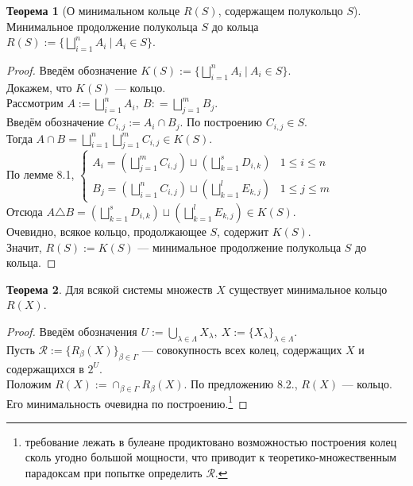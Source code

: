 \documentclass[11pt,a4paper]{report}
\theoremstyle{definition}
\theoremstyle{definition}
\newtheorem{theorem}{Теорема}[section]
\theoremstyle{definition}
\begin{document}
	\begin{theorem}[О минимальном кольце $ R(S) $, содержащем полукольцо $ S $]$  $\\
		Минимальное продолжение полукольца $ S $ до кольца $ R(S) := \{\bigsqcup_{i=1}^{n} A_{i}\ |\ A_{i} \in S \} $.
	\end{theorem}
	\begin{proof}
		Введём обозначение $ K(S) := \{\bigsqcup_{i=1}^{n} A_{i}\ |\ A_{i} \in S \} $.\\ 
		Докажем, что $ K(S) $ — кольцо.\\
		Рассмотрим $ A := \bigsqcup_{i=1}^{n}{A_{i}},\ B : = \bigsqcup_{j=1}^{m}{B_{j}} $.\\
		Введём обозначение $ C_{i,j} := A_{i} \cap B_{j} $. По построению $ C_{i,j} \in S $.\\
		Тогда $ A \cap B = \bigsqcup_{i=1}^{n}\bigsqcup_{j=1}^{m}{C_{i,j}} \in K(S) $.\\
		По лемме 8.1, 
 		$ \begin{cases} 
			 A_{i} = (\bigsqcup_{j=1}^{m}{C_{i, j}}) \sqcup (\bigsqcup_{k=1}^{s}D_{i, k})  &  1 \le i \le n \\
			 B_{j} = (\bigsqcup_{i=1}^{n}{C_{i, j}}) \sqcup (\bigsqcup_{k=1}^{l}E_{k, j})  &  1 \le j \le m 
		\end{cases} $\\
		Отсюда $ A \triangle B = (\bigsqcup_{k=1}^{s}D_{i, k}) \sqcup (\bigsqcup_{k=1}^{l}E_{k, j}) \in K(S) $.\\
		Очевидно, всякое кольцо, продолжающее $ S $, содержит $ K(S) $.\\
		Значит, $ R(S) := K(S) $ — минимальное продолжение полукольца $ S $ до кольца.
	\end{proof}
	\begin{theorem}
		Для всякой системы множеств $ X $ существует минимальное кольцо $ R(X) $.
	\end{theorem}
	\begin{proof}
		Введём обозначения $ U := \bigcup_{\lambda \in \Lambda}{X_{\lambda}},\ X :=  \{X_{\lambda}\}_{\lambda \in \Lambda} $.\\
		Пусть $ \mathcal{R} := \{R_{\beta}(X)\}_{\beta \in \Gamma} $ — совокупность всех колец, содержащих $ X $ и содержащихся в $ 2^{U} $.\\ Положим $ R(X) := \cap_{\beta \in \Gamma}R_{\beta}(X) $. По предложению 8.2., $ R(X) $ — кольцо.\\
		Его минимальность очевидна по построению.\footnote{требование лежать в булеане продиктовано возможностью построения колец сколь угодно большой мощности, что приводит к теоретико-множественным парадоксам при попытке определить $ \mathcal{R} $.}
	\end{proof}
\end{document}
